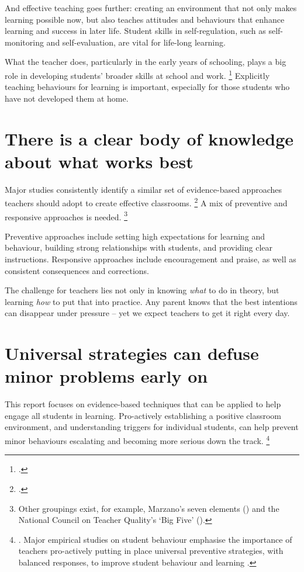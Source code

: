 \documentclass{grattan}
\begin{document}
And effective teaching goes further: creating an environment that not only makes learning possible now, but also teaches attitudes and behaviours that enhance learning and success in later life. Student skills in self-regulation, such as self-monitoring and self-evaluation, are vital for life-long learning.

What the teacher does, particularly in the early years of schooling, plays a big role in developing students' broader skills at school and work.%
    \footcites{Watkins2005ClassroomsLearningCommunities}{Watkins2013DisposedToLearn}
Explicitly teaching behaviours for learning is important, especially for those students who have not developed them at home.

\section{There is a clear body of knowledge about what works best}\label{sec:clear-body-knowledge}
Major studies consistently identify a similar set of evidence-based approaches teachers should adopt to create effective classrooms.%
    \footcites{Hattie2008visiblelearningsynthesis}{Marzano2003ClassroomManagementWorks}{Simonsen2008EvidenceBasedPractices}
A mix of preventive and responsive approaches is needed.%
    \footnote{Other groupings exist, for example, Marzano's seven elements (\textcite{Marzano2003ClassroomManagementWorks}) and the National Council on Teacher Quality's `Big Five' (\textcite{Greenberg2014TrainingOurFuture}).}

Preventive approaches include setting high expectations for learning and behaviour, building strong relationships with students, and providing clear instructions. Responsive approaches include encouragement and praise, as well as consistent consequences and corrections.

The challenge for teachers lies not only in knowing \emph{what} to do in theory, but learning \emph{how} to put that into practice. Any parent knows that the best intentions can disappear under pressure -- yet we expect teachers to get it right every day.

\section{Universal strategies can defuse minor problems early on }\label{sec:universal-strategies}

This report focuses on evidence-based techniques that can be applied to help engage all students in learning. Pro-actively establishing a positive classroom environment, and  understanding triggers for individual students, can help prevent minor behaviours escalating and becoming more serious down the track.%
    \footnote{\textcite{ShuklaMehtaAlbin2003TwelvePracticalStrategies}. Major empirical studies on student behaviour emphasise the importance of teachers pro-actively putting in place universal preventive strategies, with balanced responses, to improve student behaviour  and learning \textcites{Greenberg2014TrainingOurFuture}{Simonsen2008EvidenceBasedPractices}.}
\end{document}

